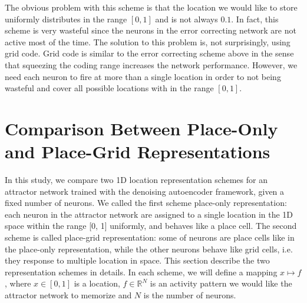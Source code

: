The obvious problem with this scheme is that the location we would like to store uniformly distributes in the range $[0, 1]$ and is not always $0.1$. In fact, this scheme is very wasteful since the neurons in the error correcting network are not active most of the time. The solution to this problem is, not surprisingly, using grid code. Grid code is similar to the error correcting scheme above in the sense that squeezing the coding range increases the network performance. However, we need each neuron to fire at more than a single location in order to not being wasteful and cover all possible locations with in the range $[0, 1]$.

\section{Comparison Between Place-Only and Place-Grid Representations}
\label{sec:grid}

In this study, we compare two 1D location representation schemes for an attractor network trained with the denoising autoencoder framework, given a fixed number of neurons. We called the first scheme place-only representation: each neuron in the attractor network are assigned to a single location in the 1D space within the range [0, 1] uniformly, and behaves like a place cell. The second scheme is called place-grid representation: some of neurons are place cells like in the place-only representation, while the other neurons behave like grid cells, i.e. they response to multiple location in space. This section describe the two representation schemes in details. In each scheme, we will define a mapping $x \mapsto f$, where $x \in [0, 1]$ is a location, $f \in \mathbb{R}^N$ is an activity pattern we would like the attractor network to memorize and $N$ is the number of neurons.

